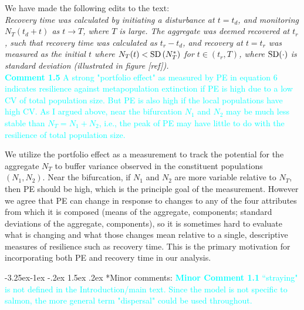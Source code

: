 \documentclass[ucm,12pt]{ucletter}
\makeatletter
\newcounter{section}
\newcounter{subsection}[section]
\newcommand\subsection{\@startsection{subsection}{2}{\z@}%
                                     {-3.25ex\@plus -1ex \@minus -.2ex}%
                                     {1.5ex \@plus .2ex}%
                                     {\normalfont\large\bfseries}}
\makeatother
\begin{document}
\begin{letter}
\noindent We have made the following edits to the text:\\
 \emph{Recovery time was calculated by initiating a disturbance at $t=t_d$, and monitoring $N_T(t_d+t)$ as $t\rightarrow T$, where $T$ is large. 
The aggregate was deemed recovered at $t_r$, such that recovery time was calculated as $t_r-t_d$, and recovery at $t=t_r$ was measured as the initial $t$ where $N_T(t) < {\rm SD}\left( N_T^* \right)$ for $t\in(t_r,T)$, where $\rm{SD}(\cdot)$ is standard deviation (illustrated in figure [ref]).}\\

\noindent \textcolor{cyan}{
{\bf Comment 1.5} A strong "portfolio effect" as measured by PE in equation 6 indicates resilience against metapopulation extinction if PE is high due to a low CV of total population size. But PE is also high if the local populations have high CV. As I argued above, near the bifurcation $N_1$ and $N_2$ may be much less stable than $N_T=N_1+N_2$, i.e., the peak of PE may have little to do with the resilience of total population size.
}

 We utilize the portfolio effect as a measurement to track the potential for the aggregate $N_T$ to buffer variance observed in the constituent populations $(N_1,N_2)$. Near the bifurcation, if $N_1$ and $N_2$ are more variable relative to $N_T$, then PE should be high, which is the principle goal of the measurement. 
However we agree that PE can change in response to changes to any of the four attributes from which it is composed (means of the aggregate, components; standard deviations of the aggregate, components), so it is sometimes hard to evaluate what is changing and what those changes mean relative to a single, descriptive measures of resilience such as recovery time. This is the primary motivation for incorporating both PE and recovery time in our analysis. 


\subsection*{Minor comments:}
\noindent \textcolor{cyan}{
{\bf Minor Comment 1.1} ``straying" is not defined in the Introduction/main text. Since the model is not specific to salmon, the more general term "dispersal" could be used throughout.}


\end{letter}
\end{document}

